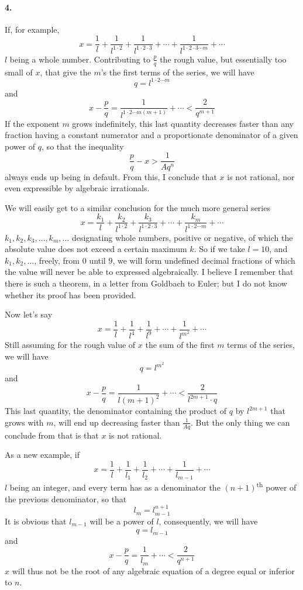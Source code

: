 \documentclass{article}
\begin{document}
\paragraph{4.}
If, for example,
$$x = \frac{1}{l} + \frac{1}{l^{1 \cdot 2}} + \frac{1}{l^{1\cdot 2\cdot 3}}
	+ \cdots + \frac{1}{l^{1\cdot 2\cdot 3\cdots m}} + \cdots$$
$l$ being a whole number. Contributing to $\frac{p}{q}$ the rough value, but
essentially too small of $x$, that give the $m$’s the first terms of the series,
we will have
$$q = l^{1\cdot 2\cdots m}$$
and
$$x - \frac{p}{q} = \frac{1}{l^{1\cdot 2\cdots m(m + 1)}} + \cdots
	< \frac{2}{q^{m+1}}$$
If the exponent $m$ grows indefinitely, this last quantity decreases faster
than any fraction having a constant numerator and a proportionate denominator of
a given power of $q$, so that the inequality
$$\frac{p}{q} - x > \frac{1}{Aq^n}$$
always ends up being in default. From this, I conclude that $x$ is not rational,
nor even expressible by algebraic irrationals.

We will easily get to a similar conclusion for the much more general series
$$x = \frac{k_1}{l} + \frac{k_2}{l^{1\cdot 2}} + \frac{k_3}{l^{1\cdot 2\cdot 3}}
	+ \cdots + \frac{k_m}{l^{1\cdot 2\cdots m}} + \cdots$$
$k_1, k_2, k_3, \ldots, k_m, \ldots$ designating whole numbers, positive or
negative, of which the absolute value does not exceed a certain maximum $k$.
So if we take $l = 10$, and $k_1, k_2, \ldots$, freely, from $0$ until $9$,
we will form undefined decimal fractions of which the value will never be able
to expressed algebraically. I believe I remember that there is such a theorem,
in a letter from Goldbach to Euler; but I do not know whether its proof has
been provided.

Now let's say
$$x = \frac{1}{l} + \frac{1}{l^4} + \frac{1}{l^9} + \cdots + \frac{1}{l^{m^2}}
	+ \cdots$$
Still assuming for the rough value of $x$ the sum of the first $m$ terms of the
series, we will have
$$q = l^{m^2}$$
and
$$x - \frac{p}{q} = \frac{1}{l{(m + 1)}^2} + \cdots
	< \frac{2}{l^{2m+1}\cdot q}$$
This last quantity, the denominator containing the product of $q$ by $l^{2m+1}$
that grows with $m$, will end up decreasing faster than $\frac{1}{Aq}$. But the
only thing we can conclude from that is that $x$ is not rational.

As a new example, if
$$x = \frac{1}{l} + \frac{1}{l_1} + \frac{1}{l_2} + \cdots
	+ \frac{1}{l_{m-1}} + \cdots$$
$l$ being an integer, and every term has as a denominator the
$(n + 1)$\textsuperscript{th} power of the previous denominator, so that
$$l_m = l_{m-1}^{n+1}$$
It is obvious that $l_{m-1}$ will be a power of $l$, consequently, we will have
$$q = l_{m-1}$$
and
$$x - \frac{p}{q}=\frac{1}{l_m}+\cdots < \frac{2}{q^{n+1}}$$
$x$ will thus not be the root of any algebraic equation of a degree equal or
inferior to $n$.
\end{document}
